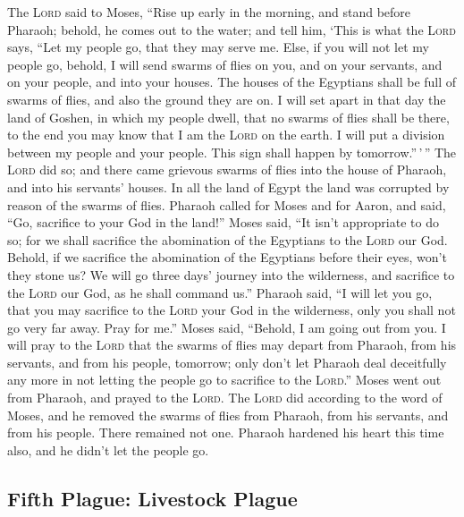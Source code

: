  The \textsc{Lord} said to Moses, ``Rise up early in the
morning, and stand before Pharaoh; behold, he comes out to the water;
and tell him, `This is what the \textsc{Lord} says, ``Let my people go,
that they may serve me.  Else, if you will not let my
people go, behold, I will send swarms of flies on you, and on your
servants, and on your people, and into your houses. The houses of the
Egyptians shall be full of swarms of flies, and also the ground they are
on.  I will set apart in that day the land of Goshen, in
which my people dwell, that no swarms of flies shall be there, to the
end you may know that I am the \textsc{Lord} on the earth.
 I will put a division between my people and your people.
This sign shall happen by tomorrow.''\,'\,''  The
\textsc{Lord} did so; and there came grievous swarms of flies into the
house of Pharaoh, and into his servants' houses. In all the land of
Egypt the land was corrupted by reason of the swarms of flies.
 Pharaoh called for Moses and for Aaron, and said, ``Go,
sacrifice to your God in the land!''  Moses said, ``It
isn't appropriate to do so; for we shall sacrifice the abomination of
the Egyptians to the \textsc{Lord} our God. Behold, if we sacrifice the
abomination of the Egyptians before their eyes, won't they stone us?
 We will go three days' journey into the wilderness, and
sacrifice to the \textsc{Lord} our God, as he shall command us.''
 Pharaoh said, ``I will let you go, that you may
sacrifice to the \textsc{Lord} your God in the wilderness, only you
shall not go very far away. Pray for me.''  Moses said,
``Behold, I am going out from you. I will pray to the \textsc{Lord} that
the swarms of flies may depart from Pharaoh, from his servants, and from
his people, tomorrow; only don't let Pharaoh deal deceitfully any more
in not letting the people go to sacrifice to the \textsc{Lord}.''
 Moses went out from Pharaoh, and prayed to the
\textsc{Lord}.  The \textsc{Lord} did according to the
word of Moses, and he removed the swarms of flies from Pharaoh, from his
servants, and from his people. There remained not one. 
Pharaoh hardened his heart this time also, and he didn't let the people
go.

\hypertarget{fifth-plague-livestock-plague}{%
\subsection{Fifth Plague: Livestock
Plague}\label{fifth-plague-livestock-plague}}

